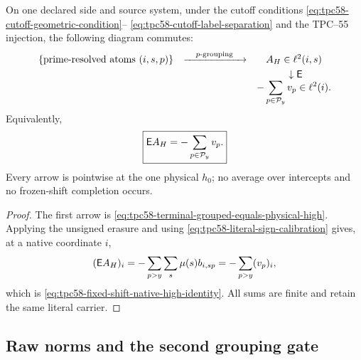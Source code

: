\begin{proposition}
\label{prop:tpc58-literal-fixed-shift-erasure}
On one declared side and source system, under the cutoff conditions
\eqref{eq:tpc58-cutoff-geometric-condition}--
\eqref{eq:tpc58-cutoff-label-separation} and the TPC--55 injection,
the following diagram commutes:
\begin{equation}
 \begin{array}{ccc}
 \{\text{prime-resolved atoms }(i,s,p)\}
 &\xrightarrow{\quad p\text{-grouping}\quad}&
 A_H\in\ell^2(i,s)\\[3pt]
 &&\ \downarrow\mathsf E\\[-1pt]
 &&-\displaystyle\sum_{p\in\mathcal P_y}v_p\in\ell^2(i).
 \end{array}
 \label{eq:tpc58-fixed-shift-commuting-diagram}
\end{equation}
Equivalently,
\begin{equation}
 \boxed{
 \mathsf E A_H=-\sum_{p\in\mathcal P_y}v_p.}
 \label{eq:tpc58-fixed-shift-native-high-identity}
\end{equation}
Every arrow is pointwise at the one physical \(h_0\); no average over
intercepts and no frozen-shift completion occurs.
\end{proposition}

\begin{proof}
The first arrow is
\eqref{eq:tpc58-terminal-grouped-equals-physical-high}.  Applying the
unsigned erasure and using
\eqref{eq:tpc58-literal-sign-calibration} gives, at a native coordinate
\(i\),
\[
 (\mathsf E A_H)_i
 =-\sum_{p>y}\sum_s\mu(s)b_{i,sp}
 =-\sum_{p>y}(v_p)_i,
\]
which is \eqref{eq:tpc58-fixed-shift-native-high-identity}.  All sums are
finite and retain the same literal carrier.
\end{proof}

\subsection{Raw norms and the second grouping gate}

